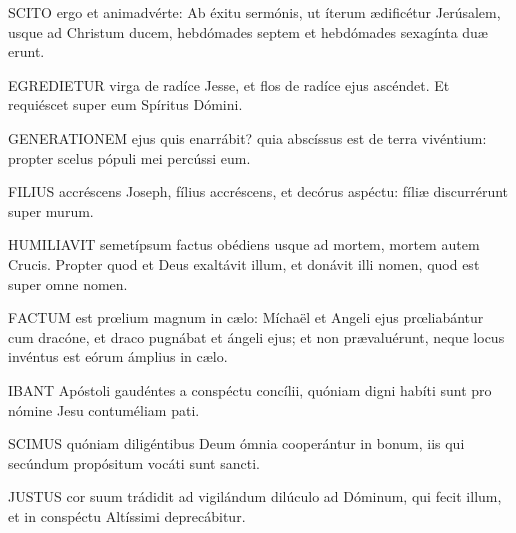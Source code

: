 
\lettrine[lines=2]{S}{CITO} ergo et animadvérte: Ab éxitu sermónis, ut íterum ædificétur Jerúsalem, usque ad Christum ducem, hebdómades septem et hebdómades sexagínta duæ erunt.


\lettrine[lines=2]{E}{GREDIETUR} virga de radíce Jesse, et flos de radíce ejus ascéndet. Et requiéscet super eum Spíritus Dómini.


\lettrine[lines=2]{G}{ENERATIONEM} ejus quis enarrábit? quia abscíssus est de terra vivéntium: propter scelus pópuli mei percússi eum.


\lettrine[lines=2]{F}{ILIUS} accréscens Joseph, fílius accréscens, et decórus aspéctu: fíliæ discurrérunt super murum.


\lettrine[lines=2]{H}{UMILIAVIT} semetípsum factus obédiens usque ad mortem, mortem autem Crucis. Propter quod et Deus exaltávit illum, et donávit illi nomen, quod est super omne nomen.


\lettrine[lines=2]{F}{ACTUM} est prœlium magnum in cælo: Míchaël et Angeli ejus prœliabántur cum dracóne, et draco pugnábat et ángeli ejus; et non prævaluérunt, neque locus invéntus est eórum ámplius in cælo.



\lettrine[lines=2]{I}{BANT} Apóstoli gaudéntes a conspéctu concílii, quóniam digni habíti sunt pro nómine Jesu contuméliam pati.


\lettrine[lines=2]{S}{CIMUS} quóniam diligéntibus Deum ómnia cooperántur in bonum, iis qui secúndum propósitum vocáti sunt sancti.


\lettrine[lines=2]{J}{USTUS} cor suum trádidit ad vigilándum dilúculo ad Dóminum, qui fecit illum, et in conspéctu Altíssimi deprecábitur.


